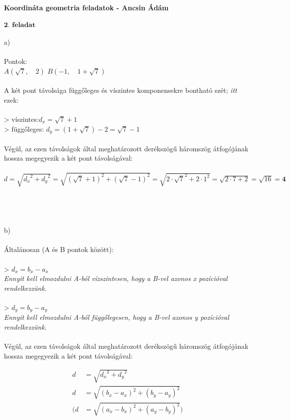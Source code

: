 \documentclass[a4paper,12pt]{article}
\begin{document}
\textbf{Koordináta geometria feladatok - Ancsin Ádám}
\\
\\ \underline{\textit{$\textbf{2. feladat} $}}
\\
\\ a)
\\
\\ Pontok:
\\ $A\left(\sqrt{7}, \quad 2\right)$ \qquad $B\left(-1, \quad 1+\sqrt{7}\right)$
\\
\\ A két pont távolsága függőleges és víszintes komponensekre bontható szét; \textit{itt} ezek:
\\
\\ > víszintes:\quad $d_{x} = \sqrt{7} + 1$
\\ > függőleges: $d_{y} = \left(1+ \sqrt{7}\right) - 2 = \sqrt{7} - 1$
\\
\\ Végül, az ezen távolságok által meghatározott derékszögű háromszög átfogójának hossza megegyezik a két pont távolságával:
\\
\\ $d = \sqrt{{d_x}^2 + {d_y}^2} = \sqrt{{\left(\sqrt{7} + 1\right)}^2 + {\left(\sqrt{7} - 1\right)}^2} = \sqrt{2\cdot\sqrt{7}^2 + 2\cdot1^2} = \sqrt{2\cdot7 + 2} = \sqrt{16} =\textbf{4}$
\\
\\ 
\\
\\
\\ b)
\\
\\ Általánosan (A és B pontok között):
\\
\\ > $d_x = b_x - a_x$
\\ \textit{Ennyit kell elmozdulni A-ból vízszintesen, hogy a B-vel azonos x pozícióval rendelkezzünk.}
\\
\\ > $d_y = b_y - a_y$
\\ \textit{Ennyit kell elmozdulni A-ból függőlegesen, hogy a B-vel azonos y pozícióval rendelkezzünk.}
\\
\\ Végül, az ezen távolságok által meghatározott derékszögű háromszög átfogójának hossza megegyezik a két pont távolságával:
\setlength{\abovedisplayskip}{0pt}
\setlength{\belowdisplayskip}{0pt}
\begin{center}
\begin{align*}
d &= \sqrt{{d_x}^2 + {d_y}^2} \\
d &= \sqrt{\left(b_x - a_x\right)^2 + \left(b_y - a_y\right)^2} \\
(d &= \sqrt{\left(a_x - b_x\right)^2 + \left(a_y - b_y\right)^2})
\end{align*}
\end{center}
\end{document}
